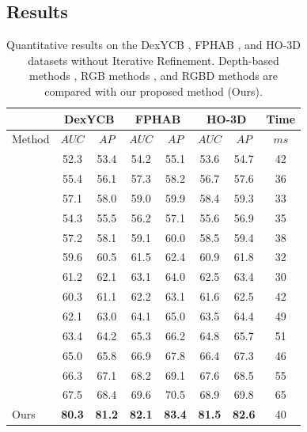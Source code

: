\subsection{Results}

\begin{table}[h]
\caption{Quantitative results on the DexYCB \cite{chao2021dexycb}, FPHAB \cite{garcia2018first}, and HO-3D \cite{hampali2020honnotate} datasets without Iterative Refinement. Depth-based methods \cite{wang20216d, gao20206d, guo2021efficient}, RGB methods \cite{billings2019silhonet, peng2019pvnet, wang2021gdr, castro2023crt}, and RGBD methods \cite{wang2019densefusion, he2020pvn3d, he2021ffb6d, wu2023geometric, hong2024rdpn6d, lin2024hipose} are compared with our proposed method (Ours).}
\label{tab:dataset_without_ir}
\begin{center}
\begin{tabular}{|l|c|c|c|c|c|c|c|} 
\hline
& \multicolumn{2}{c|}{DexYCB} & \multicolumn{2}{c|}{FPHAB} & \multicolumn{2}{c|}{HO-3D} & Time \\
\hline
Method & $AUC$ & $AP$ & $AUC$ & $AP$ & $AUC$ & $AP$ & $ms$ \\  
\hline 
\cite{wang20216d} & 52.3 & 53.4 & 54.2 & 55.1 & 53.6 & 54.7 & 42 \\
\cite{gao20206d} & 55.4 & 56.1 & 57.3 & 58.2 & 56.7 & 57.6 & 36 \\
\cite{guo2021efficient} & 57.1 & 58.0 & 59.0 & 59.9 & 58.4 & 59.3 & 33 \\
\hline 
\cite{billings2019silhonet} & 54.3 & 55.5 & 56.2 & 57.1 & 55.6 & 56.9 & 35 \\
\cite{peng2019pvnet} & 57.2 & 58.1 & 59.1 & 60.0 & 58.5 & 59.4 & 38 \\
\cite{wang2021gdr} & 59.6 & 60.5 & 61.5 & 62.4 & 60.9 & 61.8 & 32 \\
\cite{castro2023crt} & 61.2 & 62.1 & 63.1 & 64.0 & 62.5 & 63.4 & 30 \\
\hline
\cite{wang2019densefusion} & 60.3 & 61.1 & 62.2 & 63.1 & 61.6 & 62.5 & 42 \\
\cite{he2020pvn3d} & 62.1 & 63.0 & 64.1 & 65.0 & 63.5 & 64.4 & 49 \\
\cite{he2021ffb6d} & 63.4 & 64.2 & 65.3 & 66.2 & 64.8 & 65.7 & 51 \\
\cite{wu2023geometric} & 65.0 & 65.8 & 66.9 & 67.8 & 66.4 & 67.3 & 46 \\
\cite{hong2024rdpn6d} & 66.3 & 67.1 & 68.2 & 69.1 & 67.6 & 68.5 & 55 \\
\cite{lin2024hipose} & 67.5 & 68.4 & 69.6 & 70.5 & 68.9 & 69.8 & 65 \\
Ours & \textbf{80.3} & \textbf{81.2} & \textbf{82.1} & \textbf{83.4} & \textbf{81.5} & \textbf{82.6} & 40 \\
\hline
\end{tabular}
\end{center}
\end{table}


